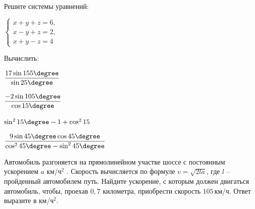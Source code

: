 \begin{listofex}
	\item Решите системы уравнений:
	\begin{enumcols}[itemcolumns=3]
	\item {}
	\item {}
	\item \( \left\{
	\begin{array}{l}
		x+y+z=6,\\
		x-y+z=2,\\
		x+y-z=4
	\end{array}
	\right. \)
	\end{enumcols}
	\item Вычислить:
	\begin{enumcols}[itemcolumns=2]
		\item \( \dfrac{17\sin155\degree}{\sin25\degree} \)
		\item \( \dfrac{-2\sin105\degree}{\cos15\degree} \)
		\item \( \sin^215\degree-1+\cos^215 \)
		\item \( \dfrac{9\sin45\degree\cos45\degree}{\cos^245\degree-\sin^245\degree} \)
	\end{enumcols}
	\item {}
	\item Автомобиль разгоняется на прямолинейном участке шоссе с постоянным ускорением \( a \) км/ч\( ^2 \) . Скорость вычисляется по формуле \( v=\sqrt{2la} \), где \( l \) -- пройденный автомобилем путь. Найдите ускорение, с которым должен двигаться автомобиль, чтобы, проехав \( 0,7 \) километра, приобрести скорость \( 105 \) км/ч. Ответ выразите в км/ч\( ^2 \).
	\item {}
	\item {}
	\item {}
\end{listofex}

